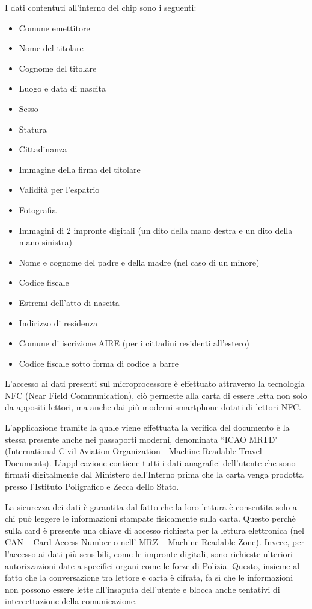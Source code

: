 I dati contentuti all'interno del chip sono i seguenti:
\begin{itemize}
    \item Comune emettitore
    \item Nome del titolare
    \item Cognome del titolare
    \item Luogo e data di nascita
    \item Sesso
    \item Statura
    \item Cittadinanza
    \item Immagine della firma del titolare
    \item Validità per l’espatrio
    \item Fotografia
    \item Immagini di 2 impronte digitali (un dito della mano destra e un dito della mano sinistra)
    \item Nome e cognome del padre e della madre (nel caso di un minore)
    \item Codice fiscale
    \item Estremi dell’atto di nascita
    \item Indirizzo di residenza
    \item Comune di iscrizione AIRE (per i cittadini residenti all’estero)
    \item Codice fiscale sotto forma di codice a barre
\end{itemize}

L'accesso ai dati presenti sul microprocessore è effettuato attraverso la tecnologia NFC  (Near Field Communication), ciò permette alla carta di essere letta non solo da appositi lettori, ma anche dai più moderni smartphone dotati di lettori NFC.

L'applicazione tramite la quale viene effettuata la verifica del documento è la stessa presente anche nei passaporti moderni, denominata ``ICAO MRTD" (International Civil Aviation Organization - Machine Readable Travel Documents). L'applicazione contiene tutti i dati anagrafici dell'utente che sono firmati digitalmente dal Ministero dell’Interno prima che la carta venga prodotta presso l’Istituto Poligrafico e Zecca dello Stato.

La sicurezza dei dati è garantita dal fatto che la loro lettura è consentita solo a chi può leggere le informazioni stampate fisicamente sulla carta. Questo perchè sulla card è presente una chiave di accesso richiesta per la lettura elettronica (nel CAN – Card Access Number o nell’ MRZ – Machine Readable Zone). Invece, per l'accesso ai dati più sensibili, come le impronte digitali, sono richieste ulteriori autorizzazioni date a specifici organi come le forze di Polizia. Questo, insieme al fatto che la conversazione tra lettore e carta è cifrata, fa sì che le informazioni non possono essere lette all'insaputa dell'utente e blocca anche tentativi di intercettazione della comunicazione.
\cite{cie}

